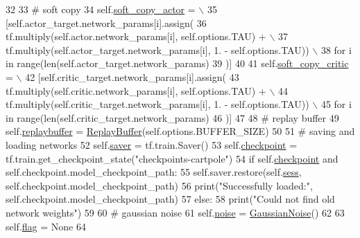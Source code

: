 \begin{DoxyCode}
32 
33         \textcolor{comment}{# soft copy}
34         self.\hyperlink{classddpg_1_1_d_d_p_g_a2bb041b9ab7c84c83f584a1eae593a87}{soft\_copy\_actor} = \(\backslash\)
35             [self.actor\_target.network\_params[i].assign(
36                 tf.multiply(self.actor.network\_params[i], self.options.TAU) + \(\backslash\)
37                 tf.multiply(self.actor\_target.network\_params[i], 1. - self.options.TAU)) \(\backslash\)
38                 \textcolor{keywordflow}{for} i \textcolor{keywordflow}{in} range(len(self.actor\_target.network\_params)
39             )]
40 
41         self.\hyperlink{classddpg_1_1_d_d_p_g_a01b575596a4ae50a5ee3656ce9529c94}{soft\_copy\_critic} = \(\backslash\)
42             [self.critic\_target.network\_params[i].assign(
43                 tf.multiply(self.critic.network\_params[i], self.options.TAU) + \(\backslash\)
44                 tf.multiply(self.critic\_target.network\_params[i], 1. - self.options.TAU)) \(\backslash\)
45                 \textcolor{keywordflow}{for} i \textcolor{keywordflow}{in} range(len(self.critic\_target.network\_params)
46             )]
47 
48         \textcolor{comment}{# replay buffer}
49         self.\hyperlink{classddpg_1_1_d_d_p_g_af2e26e10a5dd5209afa7a6f3b7d16ab7}{replaybuffer} = \hyperlink{classreplaybuffer_1_1_replay_buffer}{ReplayBuffer}(self.options.BUFFER\_SIZE)
50 
51         \textcolor{comment}{# saving and loading networks}
52         self.\hyperlink{classddpg_1_1_d_d_p_g_acbd64c92b0d268210807f4e10a214039}{saver} = tf.train.Saver()
53         self.\hyperlink{classddpg_1_1_d_d_p_g_a9e0f7ad3975f13452b47eb0a3c5194c7}{checkpoint} = tf.train.get\_checkpoint\_state(\textcolor{stringliteral}{"checkpoints-cartpole"})
54         \textcolor{keywordflow}{if} self.\hyperlink{classddpg_1_1_d_d_p_g_a9e0f7ad3975f13452b47eb0a3c5194c7}{checkpoint} \textcolor{keywordflow}{and} self.checkpoint.model\_checkpoint\_path:
55             self.saver.restore(self.\hyperlink{classddpg_1_1_d_d_p_g_a9fed3bda5c1636b1c4bb89fe3a4293c5}{sess}, self.checkpoint.model\_checkpoint\_path)
56             print(\textcolor{stringliteral}{"Successfully loaded:"}, self.checkpoint.model\_checkpoint\_path)
57         \textcolor{keywordflow}{else}:
58             print(\textcolor{stringliteral}{"Could not find old network weights"})
59 
60         \textcolor{comment}{# gaussian noise}
61         self.\hyperlink{classddpg_1_1_d_d_p_g_a9b3d7ee697bd6d7657e0e35b4c1cbd2f}{noise} = \hyperlink{classnoise_1_1_gaussian_noise}{GaussianNoise}()
62 
63         self.\hyperlink{classddpg_1_1_d_d_p_g_ae456a944d9035ea92e16b3b5d9852dcb}{flag} = \textcolor{keywordtype}{None}
64 
\end{DoxyCode}


